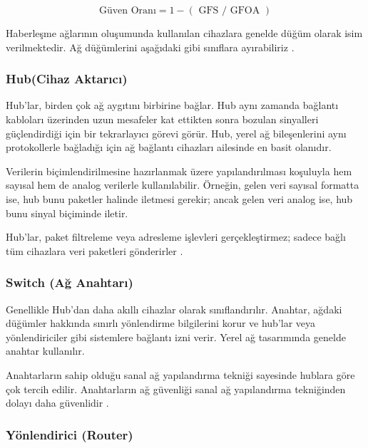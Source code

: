 \begin{equation}
\text{Güven Oranı} = 1 - (\text{ GFS / GFOA } ) \label{eq1}
\end{equation}


Haberleşme ağlarının oluşumunda kullanılan cihazlara genelde düğüm olarak isim verilmektedir. Ağ düğümlerini aşağıdaki gibi sınıflara ayırabiliriz \cite{parziale_2006}.




\subsubsection{Hub(Cihaz Aktarıcı)}

Hub'lar, birden çok ağ aygıtını birbirine bağlar. Hub aynı zamanda bağlantı kabloları üzerinden uzun mesafeler kat ettikten sonra bozulan sinyalleri güçlendirdiği için bir tekrarlayıcı görevi görür. Hub, yerel ağ bileşenlerini aynı protokollerle bağladığı için ağ bağlantı cihazları ailesinde en basit olanıdır.

Verilerin biçimlendirilmesine hazırlanmak üzere yapılandırılması koşuluyla hem sayısal hem de analog verilerle kullanılabilir. Örneğin, gelen veri sayısal formatta ise, hub bunu paketler halinde iletmesi gerekir; ancak gelen veri analog ise, hub bunu sinyal biçiminde iletir.

Hub'lar, paket filtreleme veya adresleme işlevleri gerçekleştirmez; sadece bağlı tüm cihazlara veri paketleri gönderirler \cite{parziale_2006}.




\subsubsection{Switch (Ağ Anahtarı)}

Genellikle Hub’dan daha akıllı cihazlar olarak sınıflandırılır. Anahtar, ağdaki düğümler hakkında sınırlı yönlendirme bilgilerini korur ve hub’lar veya yönlendiriciler gibi sistemlere bağlantı izni verir. Yerel ağ tasarımında genelde anahtar kullanılır.

Anahtarların sahip olduğu sanal ağ yapılandırma tekniği sayesinde hublara göre çok tercih edilir. Anahtarların ağ güvenliği sanal ağ yapılandırma tekniğinden dolayı daha güvenlidir \cite{parziale_2006}.



\subsubsection{Yönlendirici (Router)}

